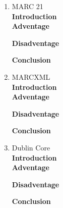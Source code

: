 \documentclass[a4paper]{article} %
\begin{document}
\begin{enumerate}
	{\bf Adventage}
	\begin{enumerate}
		
	\end{enumerate}	
	{\bf Disadventage}
	\begin{enumerate}
		
	\end{enumerate}
	{\bf Conclusion}\\
	
	\item MARC 21\\
	{\bf Introduction}\\
	
	{\bf Adventage}
	\begin{enumerate}
		
	\end{enumerate}	
	{\bf Disadventage}
	\begin{enumerate}
		
	\end{enumerate}
	{\bf Conclusion}\\
	
	\item MARCXML\\
	{\bf Introduction}\\
	
	{\bf Adventage}
	\begin{enumerate}
		
	\end{enumerate}	
	{\bf Disadventage}
	\begin{enumerate}
		
	\end{enumerate}
	{\bf Conclusion}\\
	
	\item Dublin Core\\
	{\bf Introduction}\\
	
	{\bf Adventage}
	\begin{enumerate}
		
	\end{enumerate}	
	{\bf Disadventage}
	\begin{enumerate}
		
	\end{enumerate}
	{\bf Conclusion}\\
	

\end{enumerate}
\end{document}
